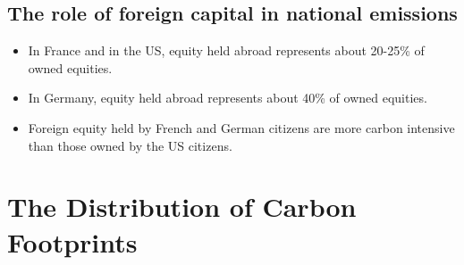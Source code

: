 \documentclass[10pt]{beamer}
\begin{document}
\subsection{The role of foreign capital in national emissions}
\begin{frame}{\subsecname}
    \begin{itemize}
        \item In France and in the US, equity held abroad represents about 20-25\% of owned equities.
        \item In Germany, equity held abroad represents about 40\% of owned equities.
        \item Foreign equity held by French and German citizens are more carbon intensive than those owned by the US citizens.
    \end{itemize}
\end{frame}

\section{The Distribution of Carbon Footprints}
\begin{frame}{\secname}
    \tableofcontents[currentsection, hideothersubsections, sections=\value{section}]
\end{frame}
\end{document}
